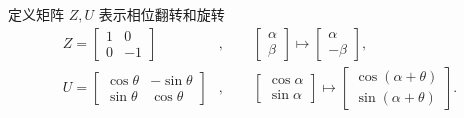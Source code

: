 定义矩阵 $Z,U$ 表示相位翻转和旋转 \begin{align}
    Z=\begin{bmatrix}
          1 & 0  \\
          0 & -1
      \end{bmatrix}           & ,\qquad
    \begin{bmatrix}
        \alpha \\\beta
    \end{bmatrix}\mapsto
    \begin{bmatrix}
        \alpha \\-\beta
    \end{bmatrix},                      \\
    U=\begin{bmatrix}
          \cos\theta & -\sin\theta \\
          \sin\theta & \cos\theta
      \end{bmatrix} & ,\qquad
    \begin{bmatrix}
        \cos\alpha \\\sin\alpha
    \end{bmatrix}\mapsto
    \begin{bmatrix}
        \cos(\alpha+\theta) \\\sin(\alpha+\theta)
    \end{bmatrix}.
\end{align}


